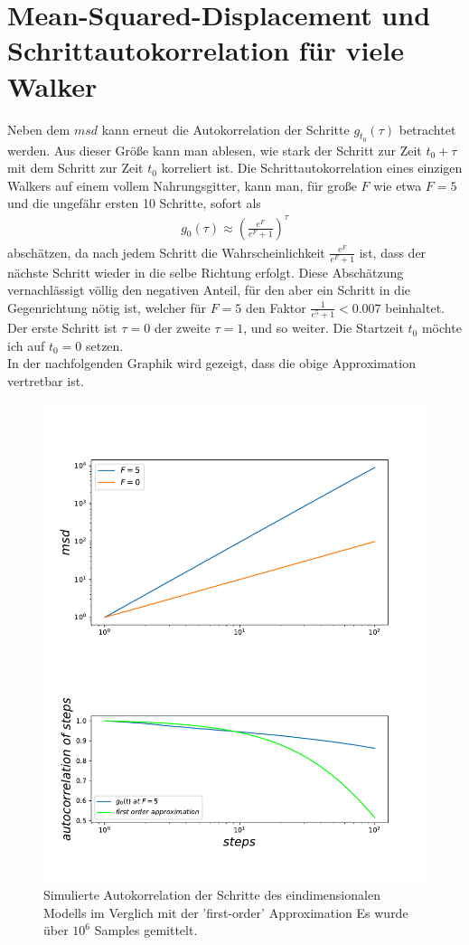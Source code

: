 \documentclass[a4paper, 12pt]{report}
\begin{document}
\section{Mean-Squared-Displacement und Schrittautokorrelation für viele Walker}
Neben dem $msd$ kann erneut die Autokorrelation der Schritte $g_{t_0}(\tau)$ betrachtet werden. Aus dieser Größe kann man ablesen, wie stark der Schritt zur Zeit $t_0 + \tau$ mit dem Schritt zur Zeit $t_0$ korreliert ist.
Die Schrittautokorrelation eines einzigen Walkers auf einem vollem Nahrungsgitter, kann man, für große $F$ wie etwa $F=5$ und die ungefähr ersten 10 Schritte, sofort als 
\begin{align}
g_{0}(\tau) \approx \left(\frac{e^F}{e^F+1}\right)^{\tau}
\end{align}
abschätzen, da nach jedem Schritt die Wahrscheinlichkeit $\frac{e^F}{e^F+1}$ ist, dass der nächste Schritt wieder in die selbe Richtung erfolgt. Diese Abschätzung vernachlässigt völlig den negativen Anteil, für den aber ein Schritt in die Gegenrichtung nötig ist, welcher für $F=5$ den Faktor $\frac{1}{e^5 + 1} < 0.007$ beinhaltet. Der erste Schritt ist $\tau = 0$ der zweite $\tau=1$, und so weiter. Die Startzeit $t_0$ möchte ich auf $t_0=0$ setzen.
\\
In der nachfolgenden Graphik wird gezeigt, dass die obige Approximation vertretbar ist.

\begin{figure}[H]
	\centering
	\includegraphics[scale=0.7]{oned_approx.pdf}
	\caption{Simulierte Autokorrelation der Schritte des eindimensionalen Modells im Verglich mit der 'first-order' Approximation \break Es wurde über $10^6$ Samples gemittelt.}
\end{figure}
\end{document}
